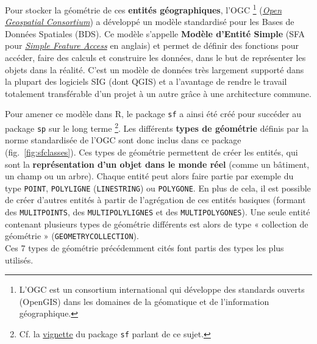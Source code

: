 \documentclass[
  french,
]{book}
\begin{document}
Pour stocker la géométrie de ces \textbf{entités géographiques},
l'OGC \footnote{L'OGC est un consortium international qui développe des standards ouverts
  (OpenGIS) dans les domaines de la géomatique et de l'information géographique.} (\href{https://www.ogc.org/}{\emph{Open Geospatial Consortium}}) a développé
un modèle standardisé pour les Bases de Données Spatiales (BDS). Ce modèle
s'appelle \textbf{Modèle d'Entité Simple} (SFA pour \href{https://www.ogc.org/standards/sfa}{\emph{Simple Feature
Access}} en anglais) et permet de définir des
fonctions pour accéder, faire des calculs et construire les données, dans le but
de représenter les objets dans la réalité. C'est un modèle de données très
largement supporté dans la plupart des logiciels SIG (dont QGIS) et a
l'avantage de rendre le travail totalement transférable d'un projet à un autre
grâce à une architecture commune.

Pour amener ce modèle dans R, le package \texttt{sf} a ainsi été créé pour succéder au
package \texttt{sp} sur le long terme \footnote{Cf. la \href{https://r-spatial.github.io/sf/articles/sf1.html}{vignette}
  du package \texttt{sf} parlant de ce sujet.}. Les différents \textbf{types de
géométrie} définis par la norme standardisée de l'OGC sont donc inclus dans ce
package (fig.~\ref{fig:sfclasses}). Ces types de géométrie permettent de créer
les entités, qui sont la \textbf{représentation d'un objet dans le monde réel} (comme
un bâtiment, un champ ou un arbre). Chaque entité peut alors faire partie par
exemple du type \texttt{POINT}, \texttt{POLYLIGNE} (\texttt{LINESTRING}) ou \texttt{POLYGONE}. En plus de
cela, il est possible de créer d'autres entités à partir de l'agrégation de ces
entités basiques (formant des \texttt{MULITPOINTS}, des \texttt{MULTIPOLYLIGNES} et des
\texttt{MULTIPOLYGONES}). Une seule entité contenant plusieurs types de géométrie
différents est alors de type « collection de géométrie » (\texttt{GEOMETRYCOLLECTION}).\\
Ces 7 types de géométrie précédemment cités font partis des types les plus
utilisés.
\end{document}
